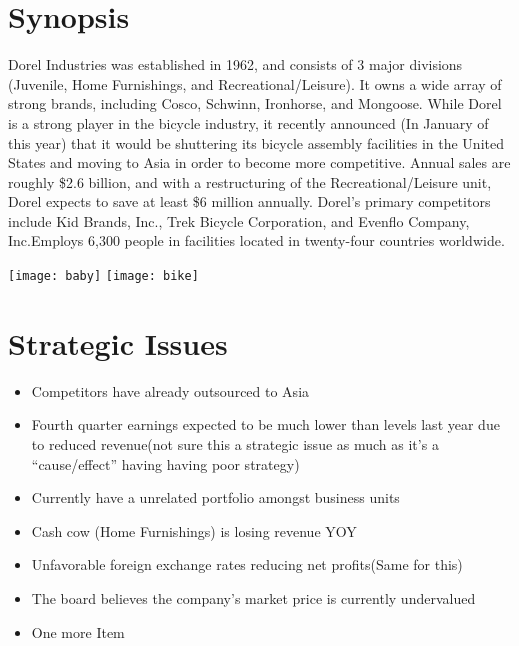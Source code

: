 
\begingroup
\let\clearpage\relax
\let\cleardoublepage\relax
\let\cleardoublepage\relax

\chapter*{Synopsis}
Dorel Industries was established in 1962, and consists of 3 major divisions (Juvenile, Home Furnishings, and Recreational/Leisure).  It owns a wide array of strong brands, including Cosco, Schwinn, Ironhorse, and Mongoose.  While Dorel is a strong player in the bicycle industry, it recently announced (In January of this year) that it would be shuttering its bicycle assembly facilities in the United States and moving to Asia in order to become more competitive.  Annual sales are roughly \$2.6 billion, and with a restructuring of the Recreational/Leisure unit, Dorel expects to save at least \$6 million annually.  Dorel’s primary competitors include Kid Brands, Inc., Trek Bicycle Corporation, and Evenflo Company, Inc.Employs 6,300 people in facilities located in twenty-four countries worldwide.


\vfill
{\texttt{[image: baby]}} 
{\texttt{[image: bike]}} 
\vfill
{}
\chapter*{Strategic Issues}

\begin{itemize}
  \item Competitors have already outsourced to Asia
  \item Fourth quarter earnings expected to be much lower than levels last year due to reduced revenue(not sure this a strategic issue as much as it’s a “cause/effect” having having poor strategy)
  \item Currently have a unrelated portfolio amongst business units
  \item Cash cow (Home Furnishings) is losing revenue YOY
  \item Unfavorable foreign exchange rates reducing net profits(Same for this)
  \item The board believes the company’s market price is currently undervalued
  \item One more Item
\end{itemize}

